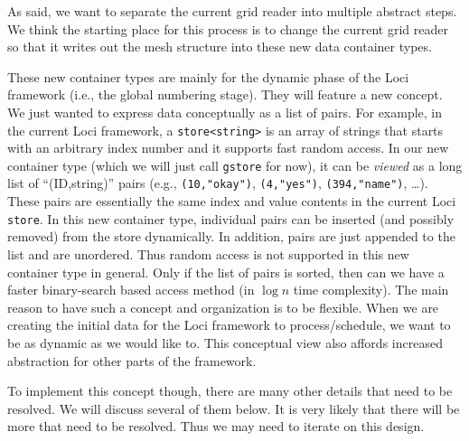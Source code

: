 \documentclass{article}
\begin{document}
As said, we want to separate the current grid reader into multiple
abstract steps. We think the starting place for this process is to
change the current grid reader so that it writes out the mesh structure
into these new data container types.

These new container types are mainly for the dynamic phase of the Loci
framework (i.e., the global numbering stage).  They will feature a new
concept.  We just wanted to express data conceptually as a list of
pairs.  For example, in the current Loci framework, a
\verb|store<string>| is an array of strings that starts with an
arbitrary index number and it supports fast random access.  In our new
container type (which we will just call \texttt{gstore} for now), it can
be \emph{viewed} as a long list of ``(ID,string)'' pairs (e.g.,
\texttt{(10,"okay")}, \texttt{(4,"yes")}, \texttt{(394,"name")},
\ldots).  These pairs are essentially the same index and value contents
in the current Loci \texttt{store}.  In this new container type,
individual pairs can be inserted (and possibly removed) from the store
dynamically.  In addition, pairs are just appended to the list and are
unordered.  Thus random access is not supported in this new container
type in general.  Only if the list of pairs is sorted, then can we have
a faster binary-search based access method (in $\log n$ time
complexity).  The main reason to have such a concept and organization is
to be flexible.  When we are creating the initial data for the Loci
framework to process/schedule, we want to be as dynamic as we would like
to.  This conceptual view also affords increased abstraction for other
parts of the framework.

To implement this concept though, there are many other details that need
to be resolved.  We will discuss several of them below.  It is very
likely that there will be more that need to be resolved.  Thus we may
need to iterate on this design.
\end{document}
